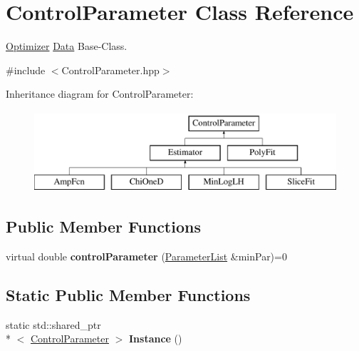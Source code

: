 \hypertarget{class_control_parameter}{\section{Control\-Parameter Class Reference}
\label{class_control_parameter}
}


\hyperlink{class_optimizer}{Optimizer} \hyperlink{class_data}{Data} Base-\/\-Class.  




{\ttfamily \#include $<$Control\-Parameter.\-hpp$>$}

Inheritance diagram for Control\-Parameter\-:\begin{figure}[H]
\begin{center}
\leavevmode
\includegraphics[height=3.000000cm]{class_control_parameter}
\end{center}
\end{figure}
\subsection*{Public Member Functions}
\begin{DoxyCompactItemize}
\item 
\hypertarget{class_control_parameter_ab3d70358bfdcf2419b501cdb8f95d382}{virtual double {\bfseries control\-Parameter} (\hyperlink{class_parameter_list}{Parameter\-List} \&min\-Par)=0}\label{class_control_parameter_ab3d70358bfdcf2419b501cdb8f95d382}

\end{DoxyCompactItemize}
\subsection*{Static Public Member Functions}
\begin{DoxyCompactItemize}
\item 
\hypertarget{class_control_parameter_a8c58559a3358f4b7a5caeeb4a4e98b5d}{static std\-::shared\-\_\-ptr\\*
$<$ \hyperlink{class_control_parameter}{Control\-Parameter} $>$ {\bfseries Instance} ()}\label{class_control_parameter_a8c58559a3358f4b7a5caeeb4a4e98b5d}

\end{DoxyCompactItemize}
